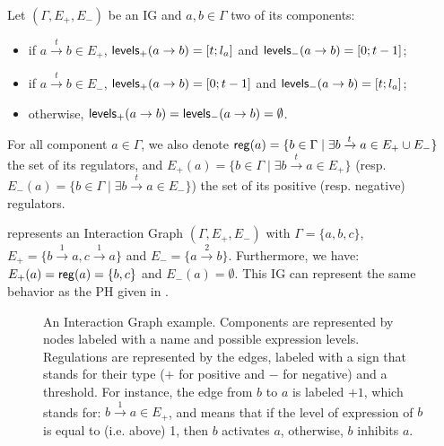 \begin{definition}\label{def:levels}
Let $(\Gamma,E_+,E_-)$ be an IG and $a, b \in \Gamma$ two of its components:
\begin{itemize}
  \item if $a \xrightarrow{t} b \in E_+$, $\mathsf{levels}_+(a\rightarrow b) = [t; l_a]$ and
    $\mathsf{levels}_-(a\rightarrow b) = [0; t-1]$;
  \item if $a \xrightarrow{t} b \in E_-$, $\mathsf{levels}_+(a\rightarrow b) = [0; t-1]$ and
    $\mathsf{levels}_-(a\rightarrow b) = [t; l_a]$;
  \item otherwise, $\mathsf{levels}_+(a\rightarrow b) = \mathsf{levels}_-(a\rightarrow b) = \emptyset$.
\end{itemize}
\end{definition}

For all component $a \in \Gamma$, we also denote $\mathsf{reg}({a}) = \{b \in \Gamma \mid \exists b \xrightarrow{t} a \in E_+ \cup E_-\}$ the set of its regulators,
and $E_+(a) = \{b \in \Gamma \mid \exists b \xrightarrow{t} a \in E_+\}$ (resp. $E_-(a) = \{b \in \Gamma \mid \exists b \xrightarrow{t} a \in E_-\}$) the set of its positive (resp. negative) regulators.

\begin{example*}
 represents an Interaction Graph $(\Gamma,E_+,E_-)$ with
$\Gamma = \{a, b, c\}$,
$E_+ = \{b \xrightarrow{1} a, c \xrightarrow{1} a\}$ and
$E_- = \{a \xrightarrow{2} b\}$.
Furthermore, we have: $E_+(a) = \mathsf{reg}({a}) = \{b, c\}$ and $E_-(a) = \emptyset$.
This IG can represent the same behavior as the PH given in .

\begin{figure}[t]
\centering
{}
\caption{\label{fig:runningBRN-ig}
An Interaction Graph example.
Components are represented by nodes labeled with a name and possible expression levels.
Regulations are represented by the edges, labeled with a sign that stands for their type ($+$ for positive and $-$ for negative) and a threshold.
For instance, the edge from $b$ to $a$ is labeled $+1$, which stands for: $b \xrightarrow{1} a \in E_+$,
and means that if the level of expression of $b$ is equal to (i.e. above) 1, then $b$ activates $a$,
otherwise, $b$ inhibits $a$.
}
\end{figure}
\end{example*}

